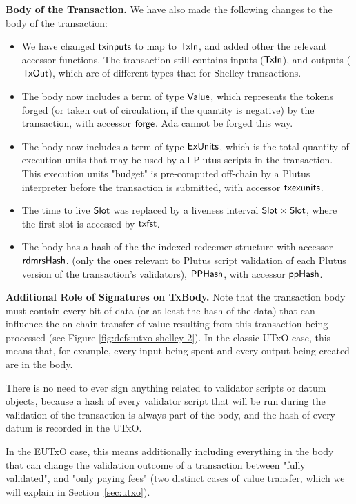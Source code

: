 \textbf{Body of the Transaction.}
We have also made the following changes to
the body of the transaction:

\begin{itemize}

  \item We have changed $\mathsf{txinputs}$ to map to $\mathsf{TxIn}$, and added other the relevant
  accessor functions. The transaction still contains inputs ($\mathsf{TxIn}$), and
  outputs ($\mathsf{TxOut}$), which are of different types than for Shelley transactions.
  \item The body now includes a term of type $\mathsf{Value}$, which represents
  the tokens forged (or taken out of circulation, if the quantity is negative)
  by the transaction,
  with accessor $\mathsf{forge}$. Ada cannot be forged this way.
  \item The body now includes a term of type $\mathsf{ExUnits}$, which is the total quantity of execution units
  that may be used by all Plutus scripts in the transaction.
  This execution units "budget" is pre-computed off-chain by a Plutus interpreter
  before the transaction is submitted, with accessor $\mathsf{txexunits}$.
  \item The
  time to live $\mathsf{Slot}$ was replaced by a liveness interval $\mathsf{Slot} \times \mathsf{Slot}$,
  where the first slot is accessed by $\mathsf{txfst}$.
  \item The body has a hash of the the indexed redeemer structure
    with accessor $\mathsf{rdmrsHash}$.
  (only the ones relevant to Plutus script validation of each Plutus
  version of the transaction's validators), $\mathsf{PPHash}$, with accessor $\mathsf{ppHash}$.
\end{itemize}

\textbf{Additional Role of Signatures on TxBody.}
Note that the transaction body must contain every bit of data
(or at least the hash of the data) that can influence the
on-chain transfer of value resulting from this transaction being processed
(see Figure \ref{fig:defs:utxo-shelley-2}).
In the classic UTxO case, this means that, for example,
every input being spent and every output being created are in the body.

There is no need to ever sign anything related to validator scripts or datum objects,
because a hash of every validator script that will be run during the validation
of the transaction is always part of the body, and the hash of every datum
is recorded in the UTxO.

In the EUTxO case, this means additionally including everything in the body that can change
the validation outcome of a transaction between "fully validated", and "only
paying fees" (two distinct cases of value transfer, which
we will explain in Section~\ref{sec:utxo}).

